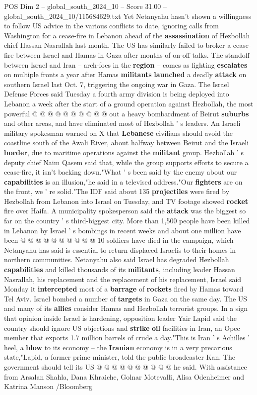 \begin{textsample}{POS Dim 2 – global\_south\_2024\_10 – Score 31.00 – global\_south\_2024\_10/115684629.txt}
Yet Netanyahu hasn't shown a willingness to follow US advice in the various conflicts to date, ignoring calls from Washington for a cease-fire in Lebanon ahead of the \textbf{assassination} of Hezbollah chief Hassan Nasrallah last month.
The US has similarly failed to broker a cease-fire between Israel and Hamas in Gaza after months of on-off talks.
The standoff between Israel and Iran -- arch-foes in the \textbf{region} -- comes as fighting \textbf{escalates} on multiple fronts a year after Hamas \textbf{militants} \textbf{launched} a deadly \textbf{attack} on southern Israel last Oct. 7, triggering the ongoing war in Gaza.
The Israel Defense Forces said Tuesday a fourth army division is being deployed into Lebanon a week after the start of a ground operation against Hezbollah, the most powerful @ @ @ @ @ @ @ @ @ @ out a heavy bombardment of Beirut \textbf{suburbs} and other areas, and have eliminated most of Hezbollah ' s leaders.
An Israeli military spokesman warned on X that \textbf{Lebanese} civilians should avoid the coastline south of the Awali River, about halfway between Beirut and the Israeli \textbf{border}, due to maritime operations against the \textbf{militant} group.
Hezbollah ' s deputy chief Naim Qasem said that, while the group supports efforts to secure a cease-fire, it isn't backing down."What ' s been said by the enemy about our \textbf{capabilities} is an illusion,"he said in a televised address."Our \textbf{fighters} are on the front, we ' re solid."The IDF said about 135 \textbf{projectiles} were fired by Hezbollah from Lebanon into Israel on Tuesday, and TV footage showed \textbf{rocket} fire over Haifa.
A municipality spokesperson said the \textbf{attack} was the biggest so far on the country ' s third-biggest city.
More than 1,500 people have been killed in Lebanon by Israel ' s bombings in recent weeks and about one million have been @ @ @ @ @ @ @ @ @ @ 10 soldiers have died in the campaign, which Netanyahu has said is essential to return displaced Israelis to their homes in northern communities.
Netanyahu also said Israel has degraded Hezbollah \textbf{capabilities} and killed thousands of its \textbf{militants}, including leader Hassan Nasrallah, his replacement and the replacement of his replacement, Israel said Monday it \textbf{intercepted} most of a \textbf{barrage} of \textbf{rockets} fired by Hamas toward Tel Aviv.
Israel bombed a number of \textbf{targets} in Gaza on the same day.
The US and many of its \textbf{allies} consider Hamas and Hezbollah terrorist groups.
In a sign that opinion inside Israel is hardening, opposition leader Yair Lapid said the country should ignore US objections and \textbf{strike} \textbf{oil} facilities in Iran, an Opec member that exports 1.7 million barrels of crude a day."This is Iran ' s Achilles ' heel, a \textbf{blow} to its economy -- the \textbf{Iranian} economy is in a very precarious state,"Lapid, a former prime minister, told the public broadcaster Kan.
The government should tell its US @ @ @ @ @ @ @ @ @ @ he said.
With assistance from Arsalan Shahla, Dana Khraiche, Golnar Motevalli, Alisa Odenheimer and Katrina Manson /Bloomberg


\end{textsample}
